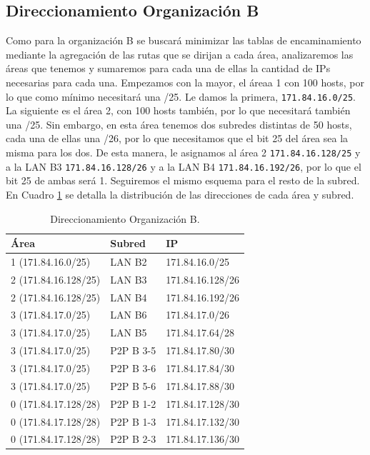 \documentclass[twoside, 11pt]{article}
\begin{document}
\subsection{Direccionamiento Organización B}
Como para la organización B se buscará minimizar las tablas de encaminamiento mediante
la agregación de las rutas que se dirijan a cada área, analizaremos las áreas que tenemos y sumaremos para cada una de ellas la cantidad de IPs necesarias para cada una. Empezamos con la mayor, el áreaa 1 con 100 hosts, por lo que como mínimo necesitará una /25. Le damos la primera, \texttt{171.84.16.0/25}. La siguiente es el área 2, con 100 hosts también, por lo que necesitará también una /25. Sin embargo, en esta área tenemos dos subredes distintas de 50 hosts, cada una de ellas una /26, por lo que necesitamos que el bit 25 del área sea la misma para los dos. De esta manera, le asignamos al área 2 \texttt{171.84.16.128/25} y a la LAN B3 \texttt{171.84.16.128/26} y a la LAN B4 \texttt{171.84.16.192/26}, por lo que el bit 25 de ambas será 1. Seguiremos el mismo esquema para el resto de la subred. En Cuadro \ref{cuad:1.2} se detalla la distribución de las direcciones de cada área y subred.

\begin{table}[h]
\centering
\begin{tabular}{l|l|l}
\toprule
\textbf{Área} & \textbf{Subred} & \textbf{IP} \\
\midrule
1 (171.84.16.0/25) & LAN B2 & 171.84.16.0/25 \\
2 (171.84.16.128/25) & LAN B3 & 171.84.16.128/26 \\
2 (171.84.16.128/25) & LAN B4 & 171.84.16.192/26 \\
3 (171.84.17.0/25) & LAN B6 & 171.84.17.0/26 \\
3 (171.84.17.0/25) & LAN B5 & 171.84.17.64/28 \\
3 (171.84.17.0/25) & P2P B 3-5 & 171.84.17.80/30 \\
3 (171.84.17.0/25) & P2P B 3-6 & 171.84.17.84/30 \\
3 (171.84.17.0/25) & P2P B 5-6 & 171.84.17.88/30 \\
0 (171.84.17.128/28) & P2P B 1-2 & 171.84.17.128/30 \\
0 (171.84.17.128/28) & P2P B 1-3 & 171.84.17.132/30 \\
0 (171.84.17.128/28) & P2P B 2-3 & 171.84.17.136/30 \\
\bottomrule
\end{tabular}
\caption{Direccionamiento Organización B.}
\label{cuad:1.2}
\end{table}
\end{document}
